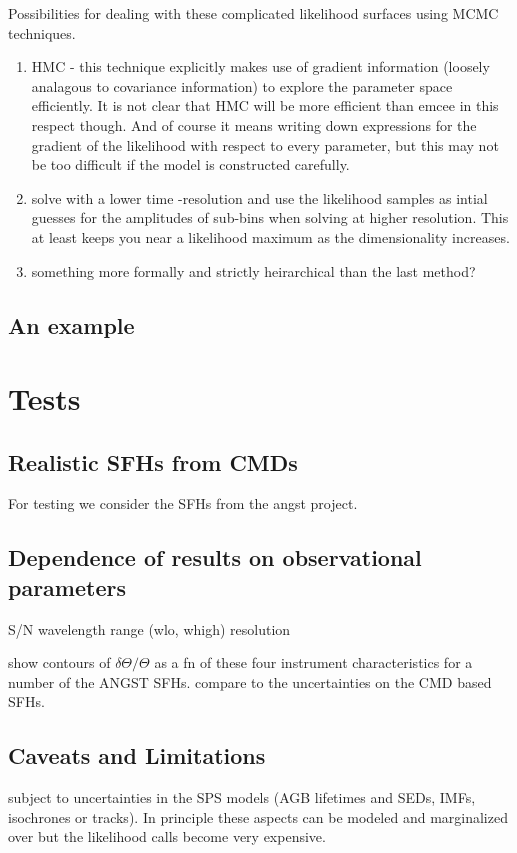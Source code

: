 Possibilities for dealing with these complicated likelihood surfaces using MCMC techniques.  
\begin{enumerate}

\item HMC - this technique explicitly makes use of gradient information (loosely analagous to covariance information) to explore the parameter space efficiently.  It is not clear that HMC will be more efficient than emcee in this respect though.  And of course it means writing down expressions for the gradient of the likelihood with respect to every parameter, but this may not be too difficult if the model is constructed carefully.

\item solve with a lower time -resolution and use the likelihood samples as  intial guesses for the amplitudes of sub-bins when solving at higher resolution.  This at least keeps you near a likelihood maximum as the dimensionality increases.

\item something more formally and strictly heirarchical than the last method?

\end{enumerate}



\subsection{An example}

\section{Tests}

\subsection{Realistic SFHs from CMDs}
For testing we consider the SFHs from the angst project. 

\subsection{Dependence of results on observational parameters}
S/N
wavelength range (wlo, whigh)
resolution

show contours of $\delta \Theta/\Theta$ as a fn of these four instrument characteristics for a number of the ANGST SFHs.  compare to the uncertainties on the CMD based SFHs.

\subsection{Caveats and Limitations}
subject to uncertainties in the SPS models (AGB lifetimes and SEDs, IMFs, isochrones or tracks).  In principle these aspects can be modeled and marginalized over \citep{conroy09} but the likelihood calls become very expensive.